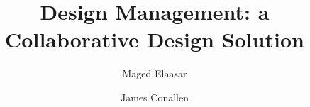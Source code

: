 
  \title{Design Management: a Collaborative Design Solution}

  \author{Maged Elaasar \and James Conallen}

  
\maketitle
\clearpage
\setcounter{page}{176}